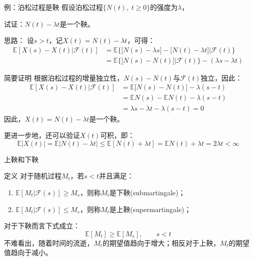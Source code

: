 \documentclass[t]{beamer}
\newcommand{\E}{\mathbb{E}}
\begin{document}
      \begin{frame}{例：泊松过程是鞅}
      假设泊松过程$\{N(t),\; t\ge 0\}$的强度为$\lambda$，
      
      试证：$N(t)-\lambda t$是一个鞅。
      
      \begin{block}{思路：}
        设$s>t$，记$X(t)=N(t)-\lambda t$，可得：
    \[\begin{split}
    \E[X(s)-X(t)|\mathcal{F}(t)]&=\E\Big\{\big[N(s)-\lambda s\big]-\big[N(t)-\lambda t\big]\Big|\mathcal{F}(t)\Big\}\\
    &=\E\Big\{\big[N(s)-N(t)\big]\Big|\mathcal{F}(t)\Big\}-(\lambda s-\lambda t)
    \end{split} \]
      \end{block}
      \end{frame}

\begin{frame}{简要证明}
    根据泊松过程的增量独立性，$N(s)-N(t)$与$\mathcal{F}(t)$独立，因此：
    \[\begin{split}
    \E[X(s)-X(t)|\mathcal{F}(t)]&=\E\big[N(s)-N(t)\big]-\lambda (s- t)\\
    &=\E N(s)-\E N(t)-\lambda(s-t)\\
    &=\lambda s-\lambda t-\lambda(s-t)=0
    \end{split} \]
    因此，$X(t)=N(t)-\lambda t$是一个鞅。
    
    更进一步地，还可以验证$X(t)$可积，即：
    \[\E|X(t)|=\E|N(t)-\lambda t|\le \E[N(t)+\lambda t]=\E N(t)+\lambda t=2\lambda t<\infty \]
\end{frame}



      
      \begin{frame}{上鞅和下鞅}
      \begin{block}{定义}
      对于随机过程$M_t$，若$s<t$并且满足：
      \begin{enumerate}
        \item $\E[M_t|\mathcal{F}(s)]\ge M_s$，则称$M_t$是下鞅(submartingale)；
        \item $\E[M_t|\mathcal{F}(s)]\le M_s$，则称$M_t$是上鞅(supermartingale)；
      \end{enumerate}
      \end{block}
      
      对于下鞅而言下式成立：
      \[\E[M_t]\ge \E[M_s], \qquad s<t \]
      不难看出，随着时间的流逝，$M_t$的期望值趋向于增大；相反对于上鞅，$M_t$的期望值趋向于减小。
      \end{frame}
      
\end{document}
